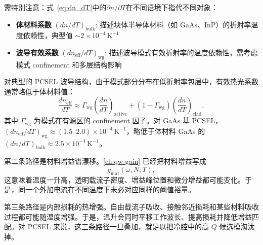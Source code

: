 \begin{MaterialSpecificityBox}
需特别注意：式~\eqref{eq:dn_dT}中的$\partial n/\partial T$在不同语境下指代不同对象：
\begin{itemize}
  \item \textbf{体材料系数} $(dn/dT)_{\mathrm{bulk}}$: 描述块体半导体材料（如 GaAs、InP）的折射率温度依赖性，典型值 $\sim 2\times10^{-4}\,\mathrm{K}^{-1}$
  \item \textbf{波导有效系数} $(dn_{\mathrm{eff}}/dT)_{\mathrm{wg}}$: 描述波导模式有效折射率的温度依赖性，需考虑模式 confinement 和多层结构影响
\end{itemize}
对典型的 PCSEL 波导结构，由于模式部分分布在低折射率包层中，有效热光系数通常略低于体材料值：
\begin{equation}
\frac{dn_{\mathrm{eff}}}{dT} \approx \Gamma_{\mathrm{wg}} \left(\frac{dn}{dT}\right)_{\mathrm{active}} + (1-\Gamma_{\mathrm{wg}}) \left(\frac{dn}{dT}\right)_{\mathrm{clad}},
\end{equation}
其中 $\Gamma_{\mathrm{wg}}$ 为模式在有源区的 confinement 因子。对 GaAs 基 PCSEL，$(dn_{\mathrm{eff}}/dT)_{\mathrm{wg}} \approx (1.5\text{--}2.0)\times10^{-4}\,\mathrm{K}^{-1}$，略低于体材料 GaAs 的 $(dn/dT)_{\mathrm{bulk}} \approx 2.5\times10^{-4}\,\mathrm{K}^{-1}$。
\end{MaterialSpecificityBox}

第二条路径是材料增益谱漂移。\cref{ch:qw-gain} 已经把材料增益写成
\begin{equation}
g_{\mathrm{mat}}(\omega,N,T),
\end{equation}
这意味着温度一升高，透明载流子密度、增益峰位置和微分增益都可能变化。于是，同一个外加电流在不同温度下未必对应同样的阈值裕量。

第三条路径是内部损耗的热增强。自由载流子吸收、接触邻近损耗和某些材料吸收过程都可能随温度增强。于是，温升会同时平移工作波长、提高损耗并降低增益匹配。对 PCSEL 来说，这三条路径一旦叠加，就足以把冷腔中的高 $Q$ 候选模淘汰掉。

